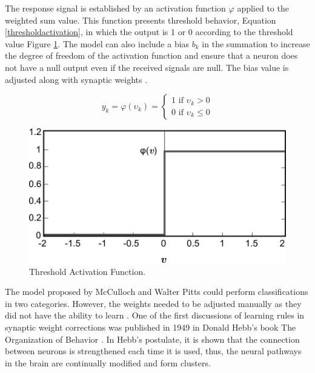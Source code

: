 The response signal is established by an activation function $\varphi$ applied to the weighted sum value. This function presents threshold behavior, Equation \ref{thresholdactivation}, in which the output is 1 or 0 according to the threshold value Figure \ref{fig:figure105}. The model can also include a bias $b_k$ in the summation to increase the degree of freedom of the activation function and ensure that a neuron does not have a null output even if the received signals are null. The bias value is adjusted along with synaptic weights \cite{haykin1999}.

\begin{equation}
\label{thresholdactivation}
y_k=\varphi(\upsilon_k)=
\begin{cases}
 1 \text{ if } \upsilon_k > 0 \\ 
 0 \text{ if } \upsilon_k \leq 0 
\end{cases}  
\end{equation}

\begin{figure}
    \centering
    \includegraphics[scale=0.55]{"Part 3 - Learning Systems/Supervised Learning/Deep Learning/images/figure105.png"}
    \caption{Threshold Activation Function.}
    \label{fig:figure105}
\end{figure}

The model proposed by McCulloch and Walter Pitts could perform classifications in two categories. However, the weights needed to be adjusted manually as they did not have the ability to learn \cite{goodfellow2016}. One of the first discussions of learning rules in synaptic weight corrections was published in 1949 in Donald Hebb's book The Organization of Behavior \cite{haykin1999}. In Hebb's postulate, it is shown that the connection between neurons is strengthened each time it is used, thus, the neural pathways in the brain are continually modified and form clusters.

